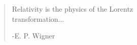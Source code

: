\chapter{}





\thispagestyle{empty}

\noindent


\vspace{4cm}

\begin{quote}
Relativity is the physics of the Lorentz\\ transformation...

\hfill{-E. P. Wigner}
\end{quote}

